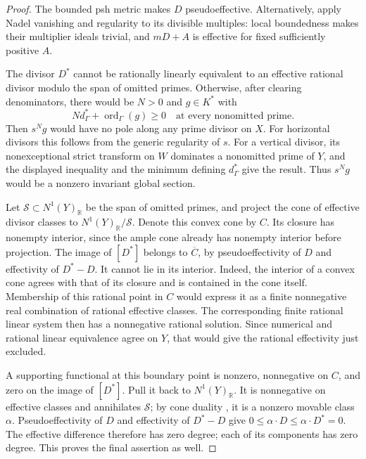 \begin{proof}
The bounded psh metric makes \(D\) pseudoeffective.  Alternatively,
apply Nadel vanishing and regularity to its divisible multiples:
local boundedness makes their multiplier ideals trivial, and
\(mD+A\) is effective for fixed sufficiently positive \(A\).

The divisor \(D^*\) cannot be rationally linearly equivalent to an
effective rational divisor modulo the span of omitted primes.
Otherwise, after clearing denominators, there would be \(N>0\)
and \(g\in K^*\) with
\[
           N d^*_\Gamma+\operatorname{ord}_\Gamma(g)\geq0
                 \quad\text{at every nonomitted prime}.
\]
Then \(s^Ng\) would have no pole along any prime divisor on \(X\).
For horizontal divisors this follows from the generic regularity of $s$.
For a vertical divisor, its nonexceptional strict transform on
\(W\) dominates a nonomitted prime of \(Y\), and the displayed
inequality and the minimum defining \(d^*_\Gamma\) give the result.
Thus \(s^Ng\) would be a nonzero invariant global section.

Let \(\mathcal S\subset N^1(Y)_{\mathbb R}\) be the span of omitted primes,
and project the cone of effective divisor classes to
\(N^1(Y)_{\mathbb R}/\mathcal S\).  Denote this convex cone by \(C\).
Its closure has nonempty interior, since the ample cone already has
nonempty interior before projection.  The image of \([D^*]\)
belongs to \(\overline C\), by pseudoeffectivity of \(D\) and
effectivity of \(D^*-D\).  It cannot lie in its interior.  Indeed,
the interior of a convex cone agrees with that of its closure and
is contained in the cone itself.  Membership of this rational point
in \(C\) would express it as a finite nonnegative real combination
of rational effective classes.  The corresponding finite rational
linear system then has a nonnegative rational solution.  Since
numerical and rational linear equivalence agree on \(Y\), that
would give the rational effectivity just excluded.

A supporting functional at this boundary point is nonzero,
nonnegative on \(C\), and zero on the image of \([D^*]\).
Pull it back to \(N^1(Y)_{\mathbb R}\).  It is nonnegative on
effective classes and annihilates \(\mathcal S\); by cone duality
\cite{BDPP2013}, it is a nonzero movable class \(\alpha\).
Pseudoeffectivity of \(D\) and effectivity of \(D^*-D\) give
\(0\leq\alpha\cdot D\leq\alpha\cdot D^*=0\).  The effective
difference therefore has zero degree; each of its components has
zero degree.  This proves the final assertion as well.
\end{proof}


